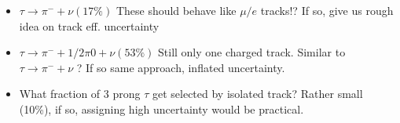 \documentclass{beamer}
\begin{document}
\begin{frame}
\begin{columns}
\begin{column}{0.35\textwidth}
 \end{column}
\end{columns}
\begin{itemize}
 \item $\tau\rightarrow\pi^{-} + \nu (17\%)$ These should behave like $\mu/e$ tracks!? If so, give us rough idea on track eff. uncertainty
   \item $\tau\rightarrow\pi^{-} + 1/2\pi0 + \nu (53\%)$ Still only one charged track. Similar to $\tau\rightarrow\pi^{-} + \nu$ ? If so same approach, inflated uncertainty.
   \item What fraction of 3 prong $\tau$ get selected by isolated track? Rather small (10\%), if so, assigning high uncertainty would be practical.
\end{itemize}
\end{frame}



\setcounter{framenumber}{32}
\end{document}
